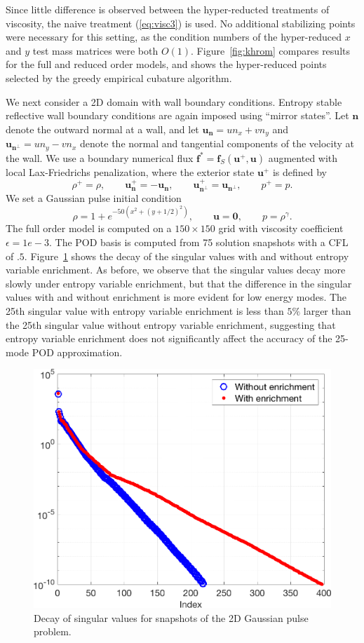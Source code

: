 \documentclass[preprint,10pt]{elsarticle}
\theoremstyle{definition}
\theoremstyle{lemma}
\theoremstyle{theorem}
\theoremstyle{assumption}
\newcommand{\LRp}[1]{\left( #1 \right)}
\begin{document}
Since little difference is observed between the hyper-reducted treatments of viscosity, the naive treatment (\ref{eq:visc3}) is used.  No additional stabilizing points were necessary for this setting, as the condition numbers of the hyper-reduced $x$ and $y$ test mass matrices were both $O(1)$.  Figure~\ref{fig:khrom} compares results for the full and reduced order models, and shows the hyper-reduced points selected by the greedy empirical cubature algorithm.  

We next consider a 2D domain with wall boundary conditions.  Entropy stable reflective wall boundary conditions are again imposed using ``mirror states''.   Let $\bm{n}$ denote the outward normal at a wall, and let $\bm{u}_{\bm{n}} = un_x + vn_y$ and $\bm{u}_{\bm{n}^\perp} = un_y - vn_x$ denote the normal and tangential components of the velocity at the wall.  We use a boundary numerical flux $\bm{f}^* = \bm{f}_S\LRp{\bm{u}^+,\bm{u}}$ augmented with local Lax-Friedrichs penalization, where the exterior state $\bm{u}^+$ is defined by
\[
\rho^+ = \rho, \qquad \bm{u}_{\bm{n}}^+ = -\bm{u}_{\bm{n}}, \qquad \bm{u}_{\bm{n}^\perp}^+ = \bm{u}_{\bm{n}^\perp}, \qquad p^+ = p.  
\]
We set a Gaussian pulse initial condition 
\[
\rho = 1 + e^{-50\LRp{x^2+(y+1/2)^2}}, \qquad \bm{u} = \bm{0}, \qquad p = \rho^{\gamma}.  
\]
The full order model is computed on a $150\times 150$ grid with viscosity coefficient $\epsilon = 1e-3$.  The POD basis is computed from 75 solution snapshots with a CFL of $.5$.  Figure~\ref{fig:pulse2dsvd} shows the decay of the singular values with and without entropy variable enrichment.  As before, we observe that the singular values decay more slowly under entropy variable enrichment, but that the difference in the singular values with and without enrichment is more evident for low energy modes.  The 25th singular value with entropy variable enrichment is less than $5\%$ larger than the 25th singular value without entropy variable enrichment, suggesting that entropy variable enrichment does not significantly affect the accuracy of the 25-mode POD approximation.  

\begin{figure}
\centering
\includegraphics[width=.4\textwidth]{figs/pulse2dsvd.png}
\caption{Decay of singular values for snapshots of the 2D Gaussian pulse problem.}
\label{fig:pulse2dsvd}
\end{figure}
\end{document}
